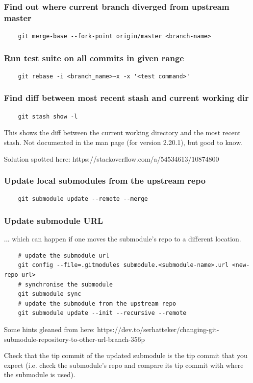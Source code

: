 \documentclass{git_course}
\begin{document}
\begin{frame}[fragile]
    \frametitle{Find out where current branch diverged from upstream master}
    \begin{lstlisting}
    git merge-base --fork-point origin/master <branch-name>
    \end{lstlisting}
\end{frame}

\begin{frame}[fragile]
    \frametitle{Run test suite on all commits in given range}
    \begin{lstlisting}
    git rebase -i <branch_name>~x -x '<test command>'
    \end{lstlisting}
\end{frame}

\begin{frame}[fragile]
    \frametitle{Find diff between most recent stash and current working dir}
    \begin{lstlisting}
    git stash show -l
    \end{lstlisting}

    This shows the diff between the current working directory and the most
    recent stash. Not documented in the  man page (for version
    2.20.1), but good to know.

    Solution spotted here: https://stackoverflow.com/a/54534613/10874800
\end{frame}

\begin{frame}[fragile]
    \frametitle{Update local submodules from the upstream repo}

    \begin{lstlisting}
    git submodule update --remote --merge
    \end{lstlisting}
\end{frame}

\begin{frame}[fragile]
    \frametitle{Update submodule URL}

    ... which can happen if one moves the submodule's repo to a different
    location.

    \begin{lstlisting}
    # update the submodule url
    git config --file=.gitmodules submodule.<submodule-name>.url <new-repo-url>
    # synchronise the submodule
    git submodule sync
    # update the submodule from the upstream repo
    git submodule update --init --recursive --remote
    \end{lstlisting}

    Some hints gleaned from here:
    https://dev.to/serhatteker/changing-git-submodule-repository-to-other-url-branch-356p

    Check that the tip commit of the updated submodule is the tip commit
    that you expect (i.e. check the submodule's repo and compare its tip
    commit with where the submodule is used).
\end{frame}
\end{document}
